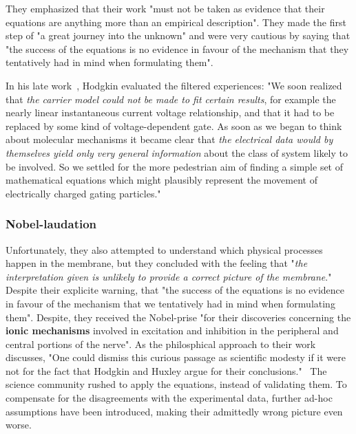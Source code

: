 They emphasized that their work 
"must not be taken as evidence that their equations are anything more than an empirical description".
They made the first step of "a great journey into the unknown" and were very cautious by saying
that "the success of the equations is no evidence in
favour of the mechanism that they tentatively had in
mind when formulating them".

In his late work~\cite{HodgkinMemoryBook:1992}, Hodgkin evaluated the filtered experiences:
"We soon realized that \textit{the carrier model could not be made to fit certain results},
for example the nearly linear instantaneous current voltage relationship, and
that it had to be replaced by some kind of voltage-dependent gate. As soon as
we began to think about molecular mechanisms it became clear that
\textit{the electrical data would by themselves yield only very general information} about the class
of system likely to be involved. So we settled for the more pedestrian aim of
finding a simple set of mathematical equations which might plausibly represent
the movement of electrically charged gating particles."


\subsubsection{Nobel-laudation\label{sec:Physiology-HodgkinHuxleyNobel}}

Unfortunately, they also attempted to understand which physical processes happen in the membrane,
but they concluded with the feeling that "\textit{the interpretation given is unlikely to provide a correct picture of the membrane}."
Despite their explicite warning, that "the success of the equations is no evidence in
favour of the mechanism that we tentatively had in
mind when formulating them". 
Despite, they received the Nobel-prise "for their discoveries concerning the
\textbf{ionic mechanisms} involved in excitation and inhibition in the peripheral and central portions of the nerve".
As the philosphical approach to their work discusses, "One could dismiss this curious passage as scientific modesty
if it were not for the fact
that Hodgkin and Huxley argue for their conclusions."~\cite{MechanisticModelHodgkinHuxleyCraver:2006}
The science community rushed to apply the equations, instead of validating them.
To compensate for the disagreements with the experimental data, further ad-hoc
assumptions have been introduced, making their admittedly wrong picture even worse.

